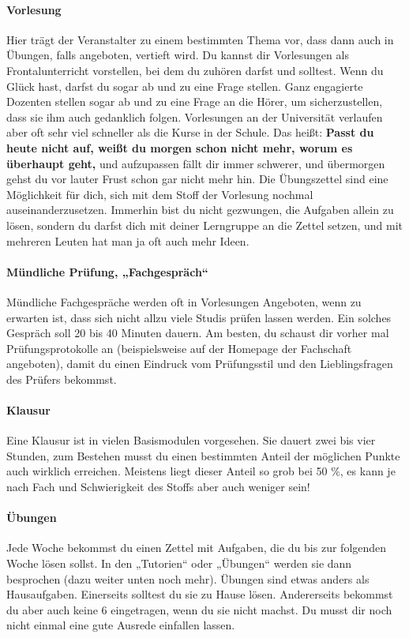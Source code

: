 \paragraph{Vorlesung} Hier trägt der Veranstalter zu einem bestimmten Thema vor, dass dann auch in Übungen, falls angeboten, vertieft wird. Du kannst dir Vorlesungen als Frontalunterricht vorstellen, bei dem du zuhören darfst und solltest. Wenn du Glück hast, darfst du sogar ab und zu eine Frage stellen. Ganz engagierte Dozenten stellen sogar ab und zu eine Frage an die Hörer, um sicherzustellen, dass sie ihm auch gedanklich folgen. Vorlesungen an der Universität verlaufen aber oft sehr viel schneller als die Kurse in der Schule. Das heißt: \textbf{Passt du heute nicht auf, weißt du morgen schon nicht mehr, worum es überhaupt geht,} und aufzupassen fällt dir immer schwerer, und übermorgen gehst du vor lauter Frust schon gar nicht mehr hin. Die Übungszettel sind eine Möglichkeit für dich, sich mit dem Stoff der Vorlesung nochmal auseinanderzusetzen. Immerhin bist du nicht gezwungen, die Aufgaben allein zu lösen, sondern du darfst dich mit deiner Lerngruppe an die Zettel setzen, und mit mehreren Leuten hat man ja oft auch mehr Ideen. 


\paragraph{Mündliche Prüfung, „Fachgespräch“} Mündliche Fachgespräche werden oft in Vorlesungen Angeboten, wenn zu erwarten ist, dass sich nicht allzu viele Studis prüfen lassen werden. Ein 
solches Gespräch soll 20 bis 40 Minuten dauern. Am besten, du schaust dir vorher mal Prüfungsprotokolle an (beispielsweise auf der Homepage der Fachschaft angeboten), damit du einen Eindruck vom Prüfungsstil und den Lieblingsfragen des Prüfers bekommst.


\paragraph{Klausur} Eine Klausur ist in vielen Basismodulen vorgesehen. Sie dauert zwei bis vier Stunden, zum Bestehen musst du einen bestimmten Anteil der möglichen Punkte auch wirklich erreichen. Meistens liegt dieser Anteil so grob bei 50 \%, es kann je nach Fach und Schwierigkeit des Stoffs aber auch weniger sein!


\paragraph{Übungen} Jede Woche bekommst du einen Zettel mit Aufgaben, die du bis zur folgenden Woche lösen sollst. In den  „Tutorien“ oder „Übungen“ werden sie dann besprochen (dazu weiter unten noch mehr). Übungen sind etwas anders als Hausaufgaben. Einerseits solltest du sie zu Hause lösen. Andererseits bekommst du aber auch keine 6 eingetragen, wenn du sie nicht machst. Du musst dir noch nicht einmal eine gute Ausrede einfallen lassen.

